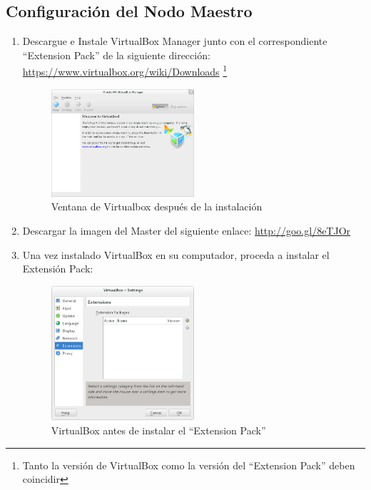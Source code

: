 \subsection{Configuración del Nodo Maestro}
\begin{enumerate}

\item Descargue e Instale VirtualBox Manager junto con el correspondiente ``Extension Pack'' de la siguiente dirección: \url{https://www.virtualbox.org/wiki/Downloads} \footnote{Tanto la versión de VirtualBox como la versión del ``Extension Pack'' deben coincidir}

	\begin{figure}[H]
		\centering
		\includegraphics[width=0.5\textwidth]{aux/vb_instalado}
		\caption{Ventana de Virtualbox después de la instalación}
		\label{vb_instalado}
	\end{figure}


\item Descargar la imagen del Master del siguiente enlace: \url{http://goo.gl/8eTJOr}

\item Una vez instalado VirtualBox en su computador, proceda a instalar el Extensión Pack: 
	
	\begin{figure}[H]
		\centering
		\includegraphics[width=0.5\textwidth]{aux/sinextensionpack}
		\caption{VirtualBox antes de instalar el ``Extension Pack''}
	\end{figure}
	

\end{enumerate}
